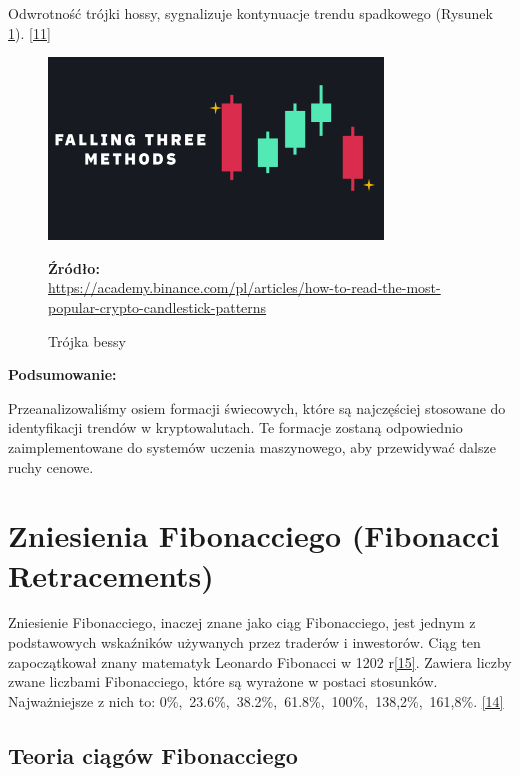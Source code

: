 \documentclass[12pt,a4paper,twoside, inzynierska]{pwr_wmat_praca_dyplomowa}
\theoremstyle{plain}
\numberwithin{theorem}{chapter}
\theoremstyle{definition}
\numberwithin{theorem}{chapter}
\begin{document}
	Odwrotność trójki hossy, sygnalizuje kontynuacje trendu spadkowego (Rysunek \ref{fig:Trójka bessy}). \hyperref[info11]{[11]}
	\vspace{12pt}
	\begin{figure}[H]
		\centering
		\includegraphics[width=0.5 \textwidth]{trojka bessy.png}
		\caption{Trójka bessy}
		\label{fig:Trójka bessy}
		\textbf{Źródło:} \\
		\url{https://academy.binance.com/pl/articles/how-to-read-the-most-popular-crypto-candlestick-patterns}
	\end{figure}
	\vspace{12pt}
	
	\noindent\textbf{Podsumowanie:}
	
	Przeanalizowaliśmy osiem formacji świecowych, które są najczęściej stosowane do identyfikacji trendów w kryptowalutach. Te formacje zostaną odpowiednio zaimplementowane do systemów uczenia maszynowego, aby przewidywać dalsze ruchy cenowe.
	\newline
	\section{Zniesienia Fibonacciego (Fibonacci Retracements)}
	
	Zniesienie Fibonacciego, inaczej znane jako ciąg Fibonacciego, jest jednym z podstawowych wskaźników używanych przez traderów i inwestorów. Ciąg ten zapoczątkował znany matematyk Leonardo Fibonacci w 1202 r\hyperref[info15]{[15]}. Zawiera liczby zwane liczbami Fibonacciego, które są wyrażone w postaci stosunków. Najważniejsze z nich to: 0\%,\ 23.6\%,\ 38.2\%,\ 61.8\%,\ 100\%,\ 138,2\%,\ 161,8\%. \hyperref[info14]{[14]}	\newline


	\subsection{Teoria ciągów Fibonacciego}
\end{document}
